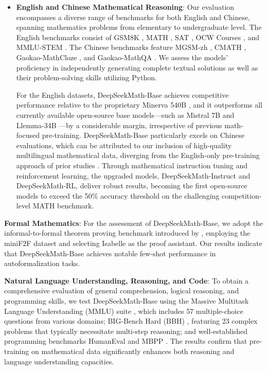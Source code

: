 \begin{itemize}[topsep=0pt]
    \item \textbf{English and Chinese Mathematical Reasoning}: Our evaluation encompasses a diverse range of benchmarks for both English and Chinese, spanning mathematics problems from elementary to undergraduate level. The English benchmarks consist of GSM8K \citep{gsm8k}, MATH \citep{MATH}, SAT \citep{llemma}, OCW Courses \citep{minerva}, and MMLU-STEM \citep{mmlu}. The Chinese benchmarks feature MGSM-zh \citep{mgsm}, CMATH \citep{wei2023cmath}, Gaokao-MathCloze \citep{agieval}, and Gaokao-MathQA \citep{agieval}. We assess the models’ proficiency in independently generating complete textual solutions as well as their problem-solving skills utilizing Python.

    For the English datasets, DeepSeekMath-Base achieves competitive performance relative to the proprietary Minerva 540B \citep{minerva}, and it outperforms all currently available open-source base models—such as Mistral 7B \citep{mistral} and Llemma-34B \citep{llemma}—by a considerable margin, irrespective of previous math-focused pre-training. DeepSeekMath-Base particularly excels on Chinese evaluations, which can be attributed to our inclusion of high-quality multilingual mathematical data, diverging from the English-only pre-training approach of prior studies \citep{minerva,llemma}. Through mathematical instruction tuning and reinforcement learning, the upgraded models, DeepSeekMath-Instruct and DeepSeekMath-RL, deliver robust results, becoming the first open-source models to exceed the 50\% accuracy threshold on the challenging competition-level MATH benchmark.
\end{itemize}

\item \textbf{Formal Mathematics}: For the assessment of DeepSeekMath-Base, we adopt the informal-to-formal theorem proving benchmark introduced by \citep{dsp_proof}, employing the miniF2F dataset \citep{minif2f} and selecting Isabelle \citep{isabelle} as the proof assistant. Our results indicate that DeepSeekMath-Base achieves notable few-shot performance in autoformalization tasks.

\item \textbf{Natural Language Understanding, Reasoning, and Code}: To obtain a comprehensive evaluation of general comprehension, logical reasoning, and programming skills, we test DeepSeekMath-Base using the Massive Multitask Language Understanding (MMLU) suite \citep{mmlu}, which includes 57 multiple-choice questions from various domains; BIG-Bench Hard (BBH) \citep{bbh}, featuring 23 complex problems that typically necessitate multi-step reasoning; and well-established programming benchmarks HumanEval \citep{codex} and MBPP \citep{mbpp}. The results confirm that pre-training on mathematical data significantly enhances both reasoning and language understanding capacities.

